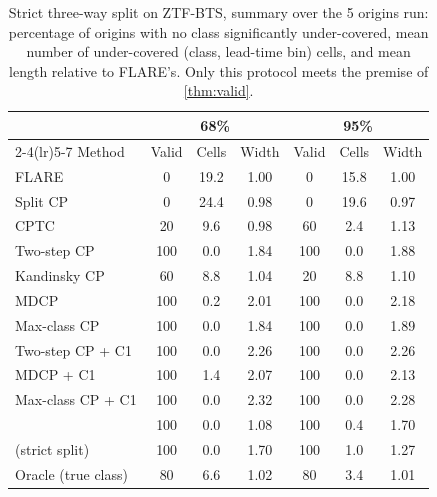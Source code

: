 \begin{table}[!htbp]
\centering
\caption{Strict three-way split on ZTF-BTS, summary over the 5 origins run: percentage of origins with no class significantly under-covered, mean number of under-covered (class, lead-time bin) cells, and mean length relative to FLARE's. Only this protocol meets the premise of \cref{thm:valid}.}
\label{tab:strictsum}
\footnotesize
\begin{tabular}{lcccccc}
\toprule
 & \multicolumn{3}{c}{68\%} & \multicolumn{3}{c}{95\%} \\
\cmidrule(lr){2-4}\cmidrule(lr){5-7}
Method & Valid & Cells & Width & Valid & Cells & Width \\
\midrule
FLARE & 0 & 19.2 & 1.00 & 0 & 15.8 & 1.00 \\
Split CP & 0 & 24.4 & 0.98 & 0 & 19.6 & 0.97 \\
CPTC & 20 & 9.6 & 0.98 & 60 & 2.4 & 1.13 \\
Two-step CP & 100 & 0.0 & 1.84 & 100 & 0.0 & 1.88 \\
Kandinsky CP & 60 & 8.8 & 1.04 & 20 & 8.8 & 1.10 \\
MDCP & 100 & 0.2 & 2.01 & 100 & 0.0 & 2.18 \\
Max-class CP & 100 & 0.0 & 1.84 & 100 & 0.0 & 1.89 \\
Two-step CP + C1 & 100 & 0.0 & 2.26 & 100 & 0.0 & 2.26 \\
MDCP + C1 & 100 & 1.4 & 2.07 & 100 & 0.0 & 2.13 \\
Max-class CP + C1 & 100 & 0.0 & 2.32 & 100 & 0.0 & 2.28 \\
\gamut{} & 100 & 0.0 & 1.08 & 100 & 0.4 & 1.70 \\
\gamut{} (strict split) & 100 & 0.0 & 1.70 & 100 & 1.0 & 1.27 \\
Oracle (true class) & 80 & 6.6 & 1.02 & 80 & 3.4 & 1.01 \\
\bottomrule
\end{tabular}
\end{table}
\FloatBarrier
\begingroup
\scriptsize\setlength{\tabcolsep}{2.5pt}
